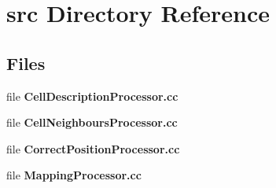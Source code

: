 \section{src Directory Reference}
\label{dir_5d446fb66940dc9be404f66fed2efcbb}
\subsection*{Files}
\begin{DoxyCompactItemize}
\item 
file {\bfseries Cell\-Description\-Processor.\-cc}
\item 
file {\bfseries Cell\-Neighbours\-Processor.\-cc}
\item 
file {\bfseries Correct\-Position\-Processor.\-cc}
\item 
file {\bfseries Mapping\-Processor.\-cc}
\end{DoxyCompactItemize}
